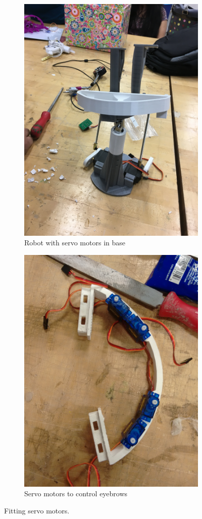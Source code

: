 \documentclass[index=totoc,hyperref,openany]{labbook} %
\begin{document}
\begin{figure}[H] %
\begin{subfigure}{.5\textwidth}
  \centering
  \includegraphics[width=.65\linewidth, angle=-90]{robo_neck_mouth}
  \caption{Robot with servo motors in base}
  \label{fig:robo_neck_mouth}
\end{subfigure}%
\begin{subfigure}{.5\textwidth}
  \centering
  \includegraphics[width=.5\linewidth]{robo_head_servos}
  \caption{Servo motors to control eyebrows}
  \label{fig:robo_head_servos}
\end{subfigure}
\caption{Fitting servo motors.}
\label{fig:servo_motors}
\end{figure}
\end{document}
